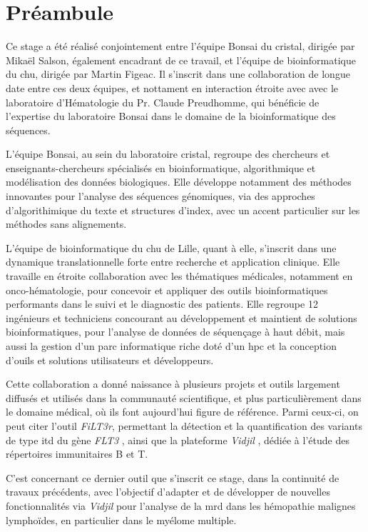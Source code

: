\chapter{Préambule}

Ce stage a été réalisé conjointement entre l'équipe Bonsai du \gls{cristal}, 
dirigée par Mikaël Salson, également encadrant de ce travail, 
et l'équipe de bioinformatique du \gls{chu}, dirigée par Martin Figeac. 
Il s'inscrit dans une collaboration de longue date entre ces deux équipes, 
et nottament en interaction étroite avec avec le laboratoire d'Hématologie du Pr. Claude Preudhomme, 
qui bénéficie de l'expertise du laboratoire Bonsai dans le domaine de la bioinformatique 
des séquences.

\vspace{1em}

L'équipe Bonsai, au sein du laboratoire \gls{cristal}, regroupe des chercheurs et enseignants-chercheurs
spécialisés en bioinformatique, algorithmique et modélisation des données biologiques. 
Elle développe notamment des méthodes innovantes pour l'analyse des séquences génomiques, 
via des approches d'algorithimique du texte et structures d'index, avec un accent particulier 
sur les méthodes sans alignements. 

\vspace{1em}

L'équipe de bioinformatique du \gls{chu} de Lille, quant à elle, 
s'inscrit dans une dynamique translationnelle forte entre recherche et application clinique. 
Elle travaille en étroite collaboration avec les thématiques médicales, notamment en onco-hématologie, 
pour concevoir et appliquer des outils bioinformatiques performants dans le suivi et le diagnostic des patients.
Elle regroupe 12 ingénieurs et techniciens concourant au développement et maintient de solutions bioinformatiques,
pour l'analyse de données de séquençage à haut débit, mais aussi la gestion d'un parc informatique riche doté 
d'un \gls{hpc} et la conception d'ouils et solutions utilisateurs et développeurs.

\vspace{1em}

Cette collaboration a donné naissance à plusieurs projets et outils 
largement diffusés et utilisés dans la communauté scientifique, 
et plus particulièrement dans le domaine médical, où ils font aujourd'hui figure de référence. 
Parmi ceux-ci, on peut citer l'outil \textit{FiLT3r}, permettant la détection 
et la quantification des variants de type \gls{itd} du gène \textit{FLT3} \cite{boudryFrugalAlignmentfreeIdentification2022}, 
ainsi que la plateforme \textit{Vidjil} \cite{duezVidjilWebPlatform2016}, dédiée à l'étude des répertoires immunitaires B et T.

\vspace{1em}

C'est concernant ce dernier outil que s'inscrit ce stage, dans la continuité de travaux précédents,
avec l'objectif d'adapter et de développer de nouvelles fonctionnalités via \textit{Vidjil} 
pour l'analyse de la \gls{mrd} dans les hémopathie malignes lymphoïdes, en particulier dans le myélome multiple.
